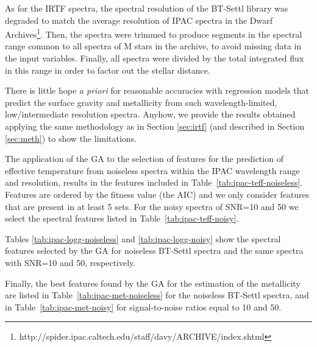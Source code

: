 
As for the IRTF spectra, the spectral resolution of the BT-Settl
library was degraded to match the average resolution of IPAC spectra
in the Dwarf
Archives\footnote{http://spider.ipac.caltech.edu/staff/davy/ARCHIVE/index.shtml}. Then,
the spectra were trimmed to produce segments in the spectral range
common to all spectra of M stars in the archive, to avoid missing data
in the input variables. Finally, all spectra were divided by the total
integrated flux in this range in order to factor out the stellar
distance.

There is little hope {\it a priori} for reasonable accuracies with
regression models that predict the surface gravity and metallicity
from such wavelength-limited, low/intermediate resolution
spectra. Anyhow, we provide the results obtained applying the same
methodology as in Section \ref{sec:irtf} (and described in
Section \ref{sec:meth}) to show the limitations.

The application of the GA to the selection of features for the
prediction of effective temperature from noiseless spectra within the
IPAC wavelength range and resolution, results in the features included
in Table~\ref{tab:ipac-teff-noiseless}. Features are ordered by the
fitness value (the AIC) and we only consider features that are present
in at least 5 sets. For the noisy spectra of SNR=10 and 50 we select
the spectral features listed in Table~\ref{tab:ipac-teff-noisy}.

Tables \ref{tab:ipac-logg-noiseless} and \ref{tab:ipac-logg-noisy}
show the spectral features selected by the GA for noiseless BT-Settl
spectra and the same spectra with SNR=10 and 50, respectively.

Finally, the best features found by the GA for the estimation of the
metallicity are listed in Table~\ref{tab:ipac-met-noiseless} for the
noiseless BT-Settl spectra, and in Table~\ref{tab:ipac-met-noisy} for
signal-to-noise ratios equal to 10 and 50.

